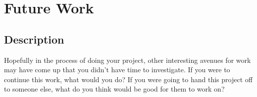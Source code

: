 \chapter{Future Work}
\label{ch:future_work}


\section{Description}
Hopefully in the process of doing your project, other interesting avenues for work may have come up that you didn't have time to investigate. If you were to continue this work, what would you do? If you were going to hand this project off to someone else, what do you think would be good for them to work on?


